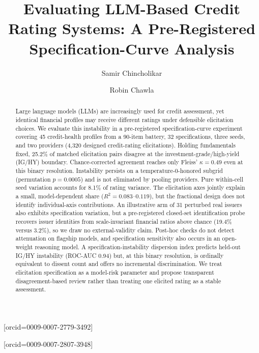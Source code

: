 \documentclass[a4paper,fleqn]{cas-sc}
\begin{document}
\let\WriteBookmarks\relax
\def\floatpagepagefraction{1}
\def\textpagefraction{.001}


\title[mode=title]{Evaluating LLM-Based Credit Rating Systems: A Pre-Registered Specification-Curve Analysis}

\author[1]{Samir Chincholikar}[orcid=0009-0007-2779-3492]

\author[1]{Robin Chawla}[orcid=0009-0007-2807-3948]
\cormark[1]



\begin{abstract}
Large language models (LLMs) are increasingly used for credit assessment, yet identical financial
profiles may receive different ratings under defensible elicitation choices. We evaluate this
instability in a pre-registered specification-curve experiment covering 45 credit-health profiles
from a 90-item battery, 32 specifications, three seeds, and two providers (4{,}320 designed
credit-rating elicitations). Holding fundamentals fixed, 25.2\% of matched elicitation pairs
disagree at the investment-grade/high-yield (IG/HY) boundary. Chance-corrected agreement reaches
only Fleiss' $\kappa=0.49$ even at this binary resolution. Instability persists on a
temperature-0-honored subgrid (permutation $p=0.0005$) and is not eliminated by pooling providers.
Pure within-cell seed variation accounts for 8.1\% of rating variance. The elicitation axes jointly
explain a small, model-dependent share ($R^2=0.083$--$0.119$), but the fractional design does not
identify individual-axis contributions. An illustrative arm of 31 perturbed real issuers also
exhibits specification variation, but a pre-registered closed-set identification probe recovers
issuer identities from scale-invariant financial ratios above chance (19.4\% versus 3.2\%), so we
draw no external-validity claim. Post-hoc checks do not detect attenuation on flagship models, and
specification sensitivity also occurs in an open-weight reasoning model. A specification-instability dispersion index predicts held-out IG/HY instability (ROC-AUC 0.94) but, at this binary resolution, is ordinally equivalent to dissent count and offers no incremental discrimination. We treat elicitation specification as a
model-risk parameter and propose transparent disagreement-based review rather than treating one
elicited rating as a stable assessment.
\end{abstract}
\end{document}
